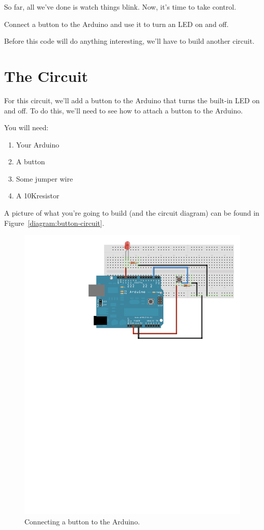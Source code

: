 So far, all we've done is watch things blink. Now, it's time to take control.

\GOALS
Connect a button to the Arduino and use it to turn an LED on and off.

\CODE


Before this code will do anything interesting, we'll have to build another circuit.

\section{The Circuit}
For this circuit, we'll add a button to the Arduino that turns the built-in LED on and off. To do this, we'll need to see how to attach a button to the Arduino.

You will need:
\begin{enumerate}
	\item Your Arduino
	\item A button
	\item Some jumper wire
	\item A 10K\ohm resistor
\end{enumerate}

A picture of what you're going to build (and the circuit diagram) can be found in Figure~\vref{diagram:button-circuit}.

\begin{figure}[h]
  \begin{center}
    \includegraphics[width=0.6\linewidth]{images/ch4-button-circuit}
    \caption{Connecting a button to the Arduino.}
    \label{diagram:ch4-button-circuit}
  \end{center}
\end{figure}

